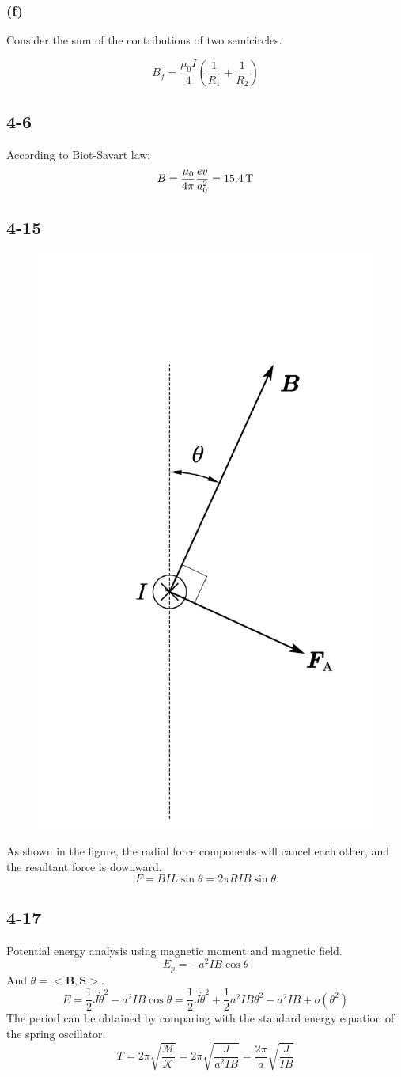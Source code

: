 \documentclass[a4paper,11pt]{amsart}
\theoremstyle{definition}
\begin{document}
	\subsubsection*{(f)}
	Consider the sum of the contributions of two semicircles.
	
	$$
	B_f=\frac{\mu _0I}{4}\left( \frac{1}{R_1}+\frac{1}{R_2} \right) 
	$$
	\subsection*{4-6}
	According to Biot-Savart law:
	$$
	B=\frac{\mu _0}{4\pi}\frac{ev}{a_{0}^{2}}=15.4\thinspace\mathrm{T}
	$$
	
	\subsection*{4-15}
	\begin{figure}
		\centering
		\includegraphics[width=0.3\linewidth]{4-17}
		\caption*{}
		\label{fig:4-17}
	\end{figure}
	As shown in the figure, the radial force components will cancel each other, and the resultant force is downward.
	$$
	F=BIL\sin\theta=2\pi RIB\sin\theta
	$$
	
	\subsection*{4-17}
	Potential energy analysis using magnetic moment and magnetic field.
	$$
	E_p=-a^2IB\cos \theta 
	$$
	And $\theta = <\bm{B}, \bm{S}>.$
	$$
	E=\frac{1}{2}J\dot{\theta}^2-a^2IB\cos \theta =\frac{1}{2}J\dot{\theta}^2+\frac{1}{2}a^2IB\theta ^2-a^2IB+o\left( \theta ^2 \right) 	
	$$
	The period can be obtained by comparing with the standard energy equation of the spring oscillator.
	$$
	T=2\pi \sqrt{\frac{\mathcal{M}}{\mathcal{K}}}=2\pi \sqrt{\frac{J}{a^2IB}}=\frac{2\pi}{a}\sqrt{\frac{J}{IB}}
	$$
\end{document}
